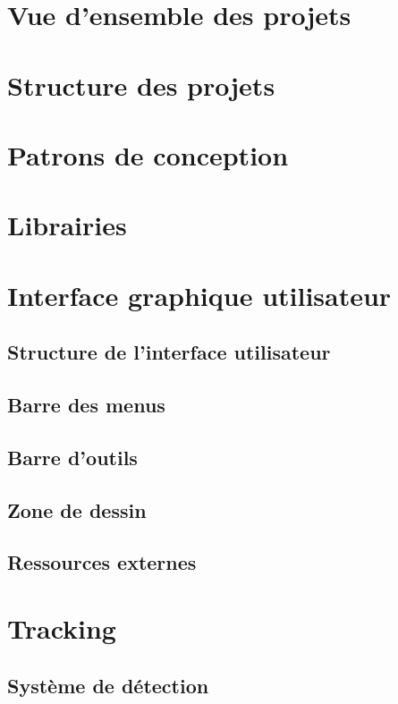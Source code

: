 \documentclass[11pt,a4paper,oldfontcommands]{memoir}
\begin{document}
\section{Vue d'ensemble des projets}

\section{Structure des projets}

\section{Patrons de conception}

\section{Librairies}

\section{Interface graphique utilisateur}

\subsection{Structure de l'interface utilisateur}

\subsection{Barre des menus}

\subsection{Barre d'outils}

\subsection{Zone de dessin}

\subsection{Ressources externes}

\section{Tracking}

\subsection{Système de détection}
\end{document}
